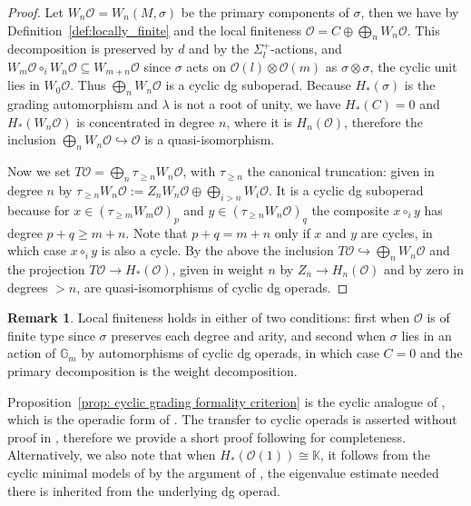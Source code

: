 \documentclass{amsart}
\newcommand{\bG}{\mathbb{G}}
\newcommand{\calO}{\mathcal{O}}
\newcommand{\kk}{\mathbb{K}}    %
\theoremstyle{definition}
\newtheorem{remark}[theorem]{Remark}%
\numberwithin{equation}{section}
\begin{document}
\begin{proof}
Let $W_n\calO=W_n(M,\sigma)$ be the primary components of $\sigma$, then we have by Definition~\ref{def:locally_finite} and the local finiteness $\calO=C\oplus\bigoplus_{n}W_n\calO$. This decomposition is
preserved by $d$ and by the $\Sigma^{+}_{l}$-actions, and
$W_m\calO\circ_{i}W_n\calO\subseteq W_{m+n}\calO$ since $\sigma$ acts on
$\calO(l)\otimes\calO(m)$ as $\sigma\otimes\sigma$, the cyclic unit lies in
$W_0\calO$. Thus $\bigoplus_{n}W_n\calO$ is a cyclic dg suboperad. Because $H_{\ast}(\sigma)$ is the grading automorphism and $\lambda$ is not a root of unity, we have $H_{\ast}(C)=0$ and $H_{\ast}(W_n\calO)$ is concentrated in degree $n$, where it is $H_{n}(\calO)$, therefore the inclusion $\bigoplus_{n}W_n\calO\hookrightarrow\calO$ is a quasi-isomorphism. 

Now we set $T\calO=\bigoplus_{n}\tau_{\geq n}W_n\calO$, with
$\tau_{\geq n}$ the canonical truncation: given in degree $n$ by $\tau_{\geq n}W_n\calO := Z_n W_n\calO \oplus \bigoplus_{i>n}W_i\calO $. It is a cyclic dg suboperad because for
$x\in(\tau_{\geq m}W_m\calO)_{p}$ and $y\in(\tau_{\geq n}W_n\calO)_{q}$ the
composite $x\circ_{i}y$ has degree $p+q\geq m+n$. Note that $p+q= m+n$ only if $x$ and $y$ are cycles, in which case $x\circ_{i}y$ is also a cycle. By the above the inclusion $T\calO\hookrightarrow\bigoplus_{n}W_n\calO$ and the projection
$T\calO\to H_{\ast}(\calO)$, given in weight $n$ by $Z_{n}\to H_{n}(\calO)$ and by zero
in degrees $>n$, are quasi-isomorphisms of cyclic dg operads.
\end{proof}

\begin{remark}\label{rem:relation_to_GNPR_Petersen}
Local finiteness holds in either of two conditions: first when $\calO$ is of finite type since $\sigma$ preserves each degree and arity, and second when $\sigma$ lies in an action of $\bG_{m}$ by automorphisms of cyclic dg operads, in which case $C=0$ and the primary decomposition is the weight decomposition. 

Proposition~\ref{prop: cyclic grading formality criterion} is the cyclic analogue of \cite[Corollary~5.2.2]{GNPR}, which is the operadic form \cite[p.~819]{petersen_formality} of \cite[Theorem~12.7]{sullivan}. The transfer to cyclic operads is asserted without proof in \cite[Section 7.1]{GNPR}, therefore we provide a short proof following \cite[Section 5]{GNPR} for completeness. Alternatively, we also note that when $H_{\ast}(\calO(1))\cong\kk$, it follows from the cyclic minimal models of
\cite[Section 7.1]{GNPR} by the argument of \cite{petersen_formality}, the eigenvalue estimate needed there is inherited from the underlying dg operad.
\end{remark}
\end{document}
